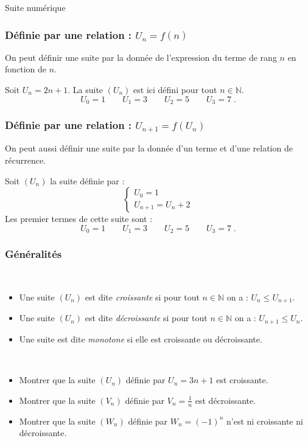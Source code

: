 \begin{chapter}{Suite num\'erique}
\subsubsection{D\'efinie par une relation : $U_{n} = f(n)$}
On peut d\'efinir une suite par la donn\'ee de l'expression du terme de rang $n$ en fonction de $n$.
\begin{ex}
      Soit $U_n = 2n + 1$.
      La suite $(U_n)$ est ici d\'efini pour tout $n \in \mathbb{N}$.
      \[
            U_0 = 1 \qquad U_1 = 3 \qquad U_2 = 5 \qquad U_3 = 7 \; .
      \]
\end{ex}
\subsubsection{D\'efinie par une relation : $U_{n+1} = f(U_n)$}
On peut aussi d\'efinir une suite par la donn\'ee d'un terme et d'une relation de r\'ecurrence.
\begin{ex}
Soit $(U_n)$ la suite d\'efinie par : 
      \[
            \left\lbrace
                  \begin{matrix}
                        U_0 = 1 \\
                        U_{n+1} = U_n + 2
                  \end{matrix}
            \right.
      \]
      Les premier termes de cette suite sont : 
      \[
            U_0 = 1 \qquad U_1 = 3 \qquad U_2 = 5 \qquad U_3 = 7 \; .
      \]
\end{ex}
%
\subsubsection{G\'en\'eralit\'es}
%
\begin{defi} ~ \\
%
\begin{itemize} 
\item Une suite $(U_n)$ est dite \emph{croissante} si pour tout $n \in \mathbb{N}$ on a : $U_{n} \leq U_{n+1}$.
\item Une suite $(U_n)$ est dite \emph{d\'ecroissante} si pour tout $n \in \mathbb{N}$ on a : $U_{n+1} \leq U_{n}$.
\item Une suite est dite \emph{monotone} si elle est croissante ou d\'ecroissante.
\end{itemize}
\end{defi}
%
\begin{exe} ~ \\
\label{exe:suite monotones}
\begin{itemize} 
\item Montrer que la suite $(U_n)$ d\'efinie par $U_n = 3 n + 1 $ est croissante.
\item Montrer que la suite $(V_n)$ d\'efinie par $V_n = \frac{1}{n} $ est d\'ecroissante.
\item Montrer que la suite $(W_n)$ d\'efinie par $W_n = (-1)^n $ n'est ni croissante ni d\'ecroissante.
\end{itemize}


\end{exe}
\end{chapter}
